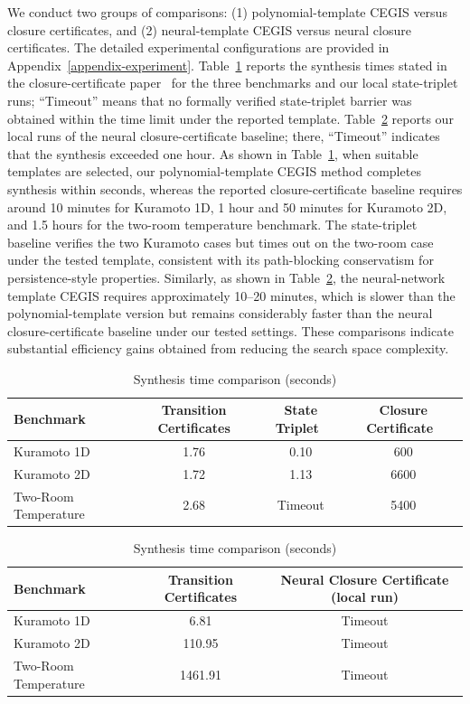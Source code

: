 We conduct two groups of comparisons: (1) polynomial-template CEGIS versus closure certificates, and (2) neural-template CEGIS versus neural closure certificates. The detailed experimental configurations are provided in Appendix~\ref{appendix-experiment}. Table~\ref{tab:results-poly} reports the synthesis times stated in the closure-certificate paper~\cite{murali2024closure} for the three benchmarks and our local state-triplet runs; ``Timeout'' means that no formally verified state-triplet barrier was obtained within the time limit under the reported template. Table~\ref{tab:results-neural} reports our local runs of the neural closure-certificate baseline; there, ``Timeout'' indicates that the synthesis exceeded one hour. As shown in Table~\ref{tab:results-poly}, when suitable templates are selected, our polynomial-template CEGIS method completes synthesis within seconds, whereas the reported closure-certificate baseline requires around 10 minutes for Kuramoto 1D, 1 hour and 50 minutes for Kuramoto 2D, and 1.5 hours for the two-room temperature benchmark. The state-triplet baseline verifies the two Kuramoto cases but times out on the two-room case under the tested template, consistent with its path-blocking conservatism for persistence-style properties. Similarly, as shown in Table~\ref{tab:results-neural}, the neural-network template CEGIS requires approximately 10--20 minutes, which is slower than the polynomial-template version but remains considerably faster than the neural closure-certificate baseline under our tested settings. These comparisons indicate substantial efficiency gains obtained from reducing the search space complexity.

\begin{table}[t]
\centering
\caption{Synthesis time comparison (seconds)}
\label{tab:results-poly}
\begin{tabular}{lccc}
\hline
\textbf{Benchmark} & \textbf{Transition Certificates} & \textbf{State Triplet~\cite{wongpiromsarn2015automata}} & \textbf{Closure Certificate~\cite{murali2024closure}} \\
\hline
Kuramoto 1D & 1.76 & 0.10 & 600 \\
Kuramoto 2D & 1.72 & 1.13 & 6600 \\
Two-Room Temperature & 2.68 & Timeout & 5400 \\
\hline
\end{tabular}
\end{table}
\begin{table}[t]
\centering
\caption{Synthesis time comparison (seconds)}
\label{tab:results-neural}
\begin{tabular}{lcc}
\hline
\textbf{Benchmark} & \textbf{Transition Certificates} & \textbf{Neural Closure Certificate (local run)} \\
\hline
Kuramoto 1D & 6.81 & Timeout \\
Kuramoto 2D & 110.95 & Timeout \\
Two-Room Temperature & 1461.91 & Timeout \\
\hline
\end{tabular}
\end{table}
